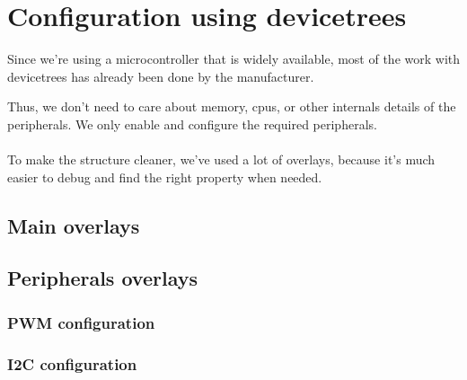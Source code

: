 \section{Configuration using devicetrees}
Since we're using a microcontroller that is widely available, most of the work with 
devicetrees has already been done by the manufacturer.

Thus, we don't need to care about memory, cpus, or other internals details of the
peripherals. We only enable and configure the required peripherals.

\paragraph{}
To make the structure cleaner, we've used a lot of overlays, because it's much easier
to debug and find the right property when needed.

\subsection{Main overlays}

\subsection{Peripherals overlays}
\subsubsection{PWM configuration}
\subsubsection{I2C configuration}